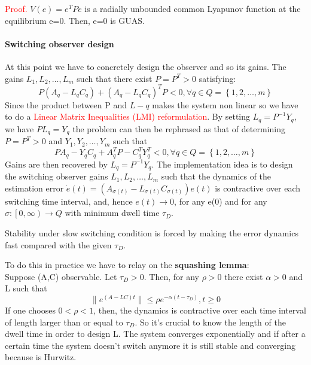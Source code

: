 \textcolor{red}{Proof.} \space $V(e)=e^TPe$ is a radially unbounded common Lyapunov function at the equilibrium e=0. Then, e=0 is GUAS.
\paragraph{Switching observer design}
At this point we have to concretely design the observer and so its gains. The gains $L_1,L_2,\dots,L_m$ such that there exist $P=P^T>0$ satisfying: \[P(A_q-L_qC_q)+(A_q-L_qC_q)^TP<0, \forall q \in Q=\left\{1,2,\dots,m\right\}
\]
Since the product between P and $L-q$ makes the system non linear so we have to do a \textcolor{red}{Linear Matrix Inequalities (LMI) reformulation}.
By setting $L_q=P^{-1}Y_q$, we have $PL_q=Y_q$ the problem can then be rephrased as that of determining $P=P^T>0$ and $Y_1,Y_2,\dots,Y_m$ such that \[
PA_q-Y_qC_q+A_q^TP-C_q^TY_q^T<0, \forall q \in  Q =\left\{1,2,\dots,m\right\}
\]
Gains are then recovered by $L_q=P^{-1}Y_q$.
The implementation idea is to design the switching observer gains $L_1,L_2,\dots,L_m$ such that the dynamics of the estimation error $\dot{e}(t)=(A_{\sigma(t)}-L_{\sigma(t)}C_{\sigma(t)})e(t)$ is contractive over each switching time interval, and, hence $e(t)\to 0$, for any e(0) and for any $\sigma \colon \left[0,\infty\right)\to Q$ with minimum dwell time $\tau_D$.
\begin{remark}
	Stability under slow switching condition is forced by making the error dynamics fast compared with the given $\tau_D$.
\end{remark}
To do this in practice we have to relay on the \textbf{squashing lemma}:\\
Suppose (A,C) observable. Let $\tau_D>0$. Then, for any $\rho >0$ there exist $\alpha>0$ and L such that \[\|e^{(A-LC)t}\| \le \rho e^{-\alpha(t-\tau_D)}, t \ge 0\]
If one chooses $0<\rho<1$, then, the dynamics is contractive over each time interval of length larger than or equal to $\tau_D$. So it's crucial to know the length of the dwell time in order to design L. The system converges exponentially and if after a certain time the system doesn't switch anymore it is still stable and converging because is Hurwitz.
